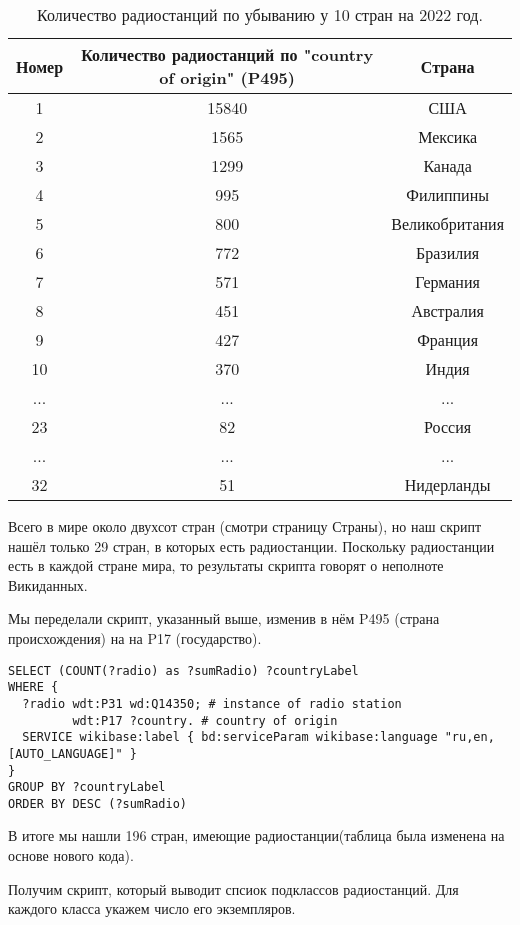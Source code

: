 \begin{table}[ht]
\centering
\caption{Количество радиостанций по убыванию у 10 стран на 2022 год.}
\begin{tabular}{|c|c|c|}
\hline
Номер & Количество радиостанций по "country of origin" (P495) & Страна \\
\hline
1 & 15840 & США \\
2 & 1565 & Мексика \\
3 & 1299 & Канада \\
4 & 995 & Филиппины \\
5 & 800 & Великобритания \\
6 & 772 & Бразилия \\
7 & 571 & Германия \\
8 & 451 & Австралия \\
9 & 427 & Франция \\
10 & 370 & Индия \\
... & ... & ... \\
23 & 82 & Россия \\
... & ... & ... \\
32 & 51 & Нидерланды \\
\hline
\end{tabular}
\end{table}

Всего в мире около двухсот стран (смотри страницу Страны), но наш скрипт нашёл только \num{29} стран, в которых есть радиостанции. Поскольку радиостанции есть в каждой стране мира, то результаты скрипта говорят о неполноте Викиданных.

\newpage

Мы переделали скрипт, указанный выше, изменив в нём P495 (страна происхождения) на на P17 (государство).

\begin{lstlisting}
SELECT (COUNT(?radio) as ?sumRadio) ?countryLabel
WHERE {
  ?radio wdt:P31 wd:Q14350; # instance of radio station
         wdt:P17 ?country. # country of origin
  SERVICE wikibase:label { bd:serviceParam wikibase:language "ru,en,[AUTO_LANGUAGE]" }
}
GROUP BY ?countryLabel
ORDER BY DESC (?sumRadio)\end{lstlisting}%


В итоге мы нашли \num{196} стран, имеющие радиостанции(таблица была изменена на основе нового кода).

Получим скрипт, который выводит спсиок подклассов радиостанций. Для каждого класса укажем число его экземпляров.

